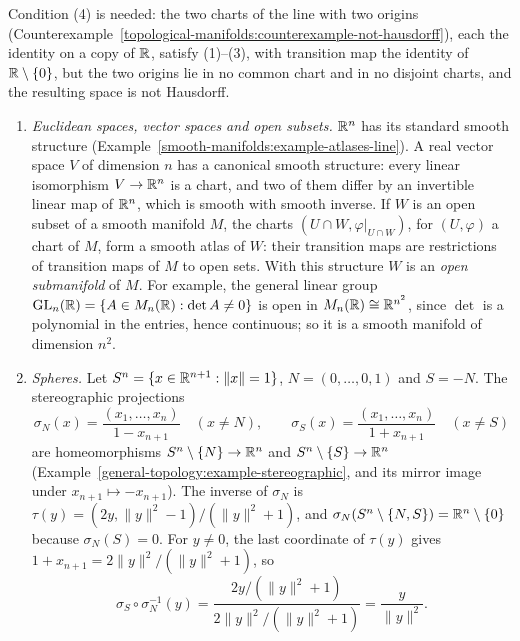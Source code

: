 \begin{counterexample}\label{smooth-manifolds:counterexample-chart-lemma}
Condition (4) is needed: the two charts of the line with two origins (Counterexample~\ref{topological-manifolds:counterexample-not-hausdorff}), each the identity on a copy of $\mathbb{R}$, satisfy (1)--(3), with transition map the
identity of $\mathbb{R} \setminus \{0\}$, but the two origins lie in no common chart and in no disjoint charts, and the resulting space is not Hausdorff.
\end{counterexample}

\begin{example}\label{smooth-manifolds:example-manifolds}
\begin{enumerate}
\item \emph{Euclidean spaces, vector spaces and open subsets.} $\mathbb{R}^n$ has its standard smooth structure (Example~\ref{smooth-manifolds:example-atlases-line}).
A real vector space $V$ of dimension $n$ has a canonical smooth structure: every linear isomorphism $V \to \mathbb{R}^n$ is a chart, and two of them differ by an
invertible linear map of $\mathbb{R}^n$, which is smooth with smooth inverse. If $W$ is an open subset of a smooth manifold $M$, the charts $(U \cap W,
\varphi|_{U \cap W})$, for $(U, \varphi)$ a chart of $M$, form a smooth atlas of $W$: their transition maps are restrictions of transition maps of $M$ to open
sets. With this structure $W$ is an \emph{open submanifold} of $M$. For example, the general linear group
$\mathrm{GL}_n(\mathbb{R}) = \{A \in M_n(\mathbb{R}) : \det A \neq 0\}$ is open in $M_n(\mathbb{R}) \cong \mathbb{R}^{n^2}$, since $\det$ is a polynomial in the entries, hence continuous; so it is a
smooth manifold of dimension $n^2$.
\item \emph{Spheres.} Let $S^n = \{x \in \mathbb{R}^{n+1} : \|x\| = 1\}$, $N = (0, \ldots, 0, 1)$ and $S = -N$. The stereographic projections
\[
\sigma_N(x) = \frac{(x_1, \ldots, x_n)}{1 - x_{n+1}} \quad (x \neq N), \qquad \sigma_S(x) = \frac{(x_1, \ldots, x_n)}{1 + x_{n+1}} \quad (x \neq S)
\]
are homeomorphisms $S^n \setminus \{N\} \to \mathbb{R}^n$ and $S^n \setminus \{S\} \to \mathbb{R}^n$ (Example~\ref{general-topology:example-stereographic}, and its mirror
image under $x_{n+1} \mapsto -x_{n+1}$). The inverse of $\sigma_N$ is $\tau(y) = (2y, \|y\|^2 - 1)/(\|y\|^2 + 1)$, and $\sigma_N(S^n \setminus \{N, S\}) =
\mathbb{R}^n \setminus \{0\}$ because $\sigma_N(S) = 0$. For $y \neq 0$, the last coordinate of $\tau(y)$ gives $1 + x_{n+1} = 2\|y\|^2/(\|y\|^2 + 1)$, so
\[
\sigma_S \circ \sigma_N^{-1}(y) = \frac{2y/(\|y\|^2 + 1)}{2\|y\|^2/(\|y\|^2 + 1)} = \frac{y}{\|y\|^2}.
\]
\end{enumerate}
\end{example}
